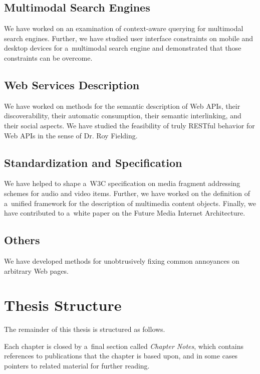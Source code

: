 \subsection{Multimodal Search Engines}

We have worked on an examination of context-aware querying
for multimodal search engines.
Further, we have studied user interface constraints on
mobile and desktop devices for a~multimodal search engine
and demonstrated that those constraints can be overcome.

\subsection{Web Services Description}

We have worked on methods for the semantic description of Web APIs,
their discoverability, their automatic consumption,
their semantic interlinking, and their social aspects.
We have studied the feasibility of truly RESTful behavior
for Web APIs in the sense of Dr. Roy Fielding.
        
\subsection{Standardization and Specification}        
We have helped to shape a~W3C specification on media
fragment addressing schemes for audio and video items.
Further, we have worked on the definition of a~unified framework
for the description of multimedia content objects.
Finally, we have contributed to a~white paper on the
Future Media Internet Architecture.

\subsection{Others}

We have developed methods for unobtrusively fixing
common annoyances on arbitrary Web pages.

\section{Thesis Structure}

The remainder of this thesis is structured as follows. 

Each chapter is closed by a~final section called
\emph{Chapter Notes}, which contains references to publications
that the chapter is based upon,
and in some cases pointers to related material for further reading.